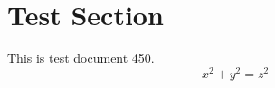 \documentclass{article}
\begin{document}
\section{Test Section}
This is test document 450.
\begin{equation}
x^2 + y^2 = z^2
\end{equation}
\end{document}
